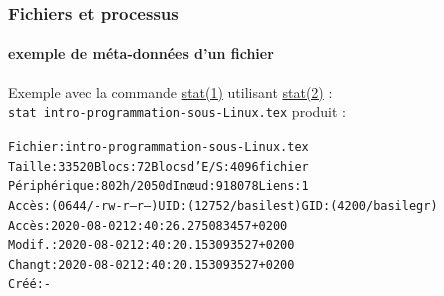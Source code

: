 \documentclass[xcolor=svgnames,final,smaller,a4]{beamer}
\begin{document}
\begin{frame}
  \frametitle{Fichiers et processus}
  \framesubtitle{exemple de méta-données d'un fichier}
  
        Exemple avec la commande
        \href{https://man7.org/linux/man-pages/man2/stat.1.html}{stat(1)}
        utilisant
        \href{https://man7.org/linux/man-pages/man2/stat.2.html}{stat(2)}
        : \\ \texttt{stat intro-programmation-sous-Linux.tex} produit
        :

        \begin{relsize}{-0.5}
        \begin{alltt}
          Fichier : intro-programmation-sous-Linux.tex\\
         Taille : 33520     	Blocs : 72         Blocs d'E/S : 4096   fichier \\
      Périphérique: 802h/2050d	Inœud: 918078      Liens: 1\\
      Accès: (0644/-rw-r--r--)  UID: (12752/basilest)   GID: ( 4200/basilegr)\\
      Accès: 2020-08-02 12:40:26.275083457 +0200\\
      Modif.: 2020-08-02 12:40:20.153093527 +0200\\
      Changt: 2020-08-02 12:40:20.153093527 +0200\\
        Créé: -
        \end{alltt}
        \end{relsize}
\end{frame}
\end{document}
